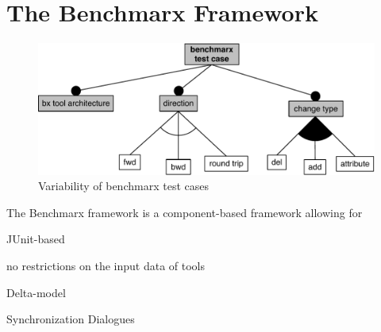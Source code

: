 \section{The Benchmarx Framework}
\label{sec:Benchmarx}



\begin{figure}[tb!]
	\centering
	\includegraphics[width=\columnwidth]{diagrams/framework/feature-model-benchmarx-test-case}
	\caption{Variability of benchmarx test cases}
	\label{fig:featureModelBenchmarxTestCase}
\end{figure}

The Benchmarx framework is a component-based framework allowing for 

JUnit-based

no restrictions on the input data of tools

Delta-model

Synchronization Dialogues


